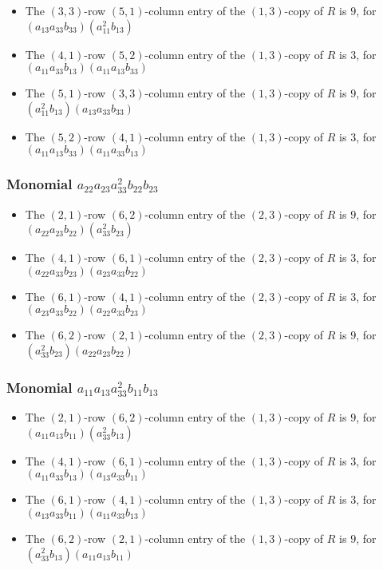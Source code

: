 \documentclass{article}
\begin{document}
\begin{itemize}
\item The $(3, 3)$-row $(5, 1)$-column entry of the $ \left(1, 3\right) $-copy of $R$ is $ 9 $, for $( a_{13} a_{33} b_{33} )( a_{11}^{2} b_{13} )$ 
\item The $(4, 1)$-row $(5, 2)$-column entry of the $ \left(1, 3\right) $-copy of $R$ is $ 3 $, for $( a_{11} a_{33} b_{13} )( a_{11} a_{13} b_{33} )$ 
\item The $(5, 1)$-row $(3, 3)$-column entry of the $ \left(1, 3\right) $-copy of $R$ is $ 9 $, for $( a_{11}^{2} b_{13} )( a_{13} a_{33} b_{33} )$ 
\item The $(5, 2)$-row $(4, 1)$-column entry of the $ \left(1, 3\right) $-copy of $R$ is $ 3 $, for $( a_{11} a_{13} b_{33} )( a_{11} a_{33} b_{13} )$ 
\end{itemize}
\subsubsection{Monomial $ a_{22} a_{23} a_{33}^{2} b_{22} b_{23} $}

\begin{itemize}
\item The $(2, 1)$-row $(6, 2)$-column entry of the $ \left(2, 3\right) $-copy of $R$ is $ 9 $, for $( a_{22} a_{23} b_{22} )( a_{33}^{2} b_{23} )$ 
\item The $(4, 1)$-row $(6, 1)$-column entry of the $ \left(2, 3\right) $-copy of $R$ is $ 3 $, for $( a_{22} a_{33} b_{23} )( a_{23} a_{33} b_{22} )$ 
\item The $(6, 1)$-row $(4, 1)$-column entry of the $ \left(2, 3\right) $-copy of $R$ is $ 3 $, for $( a_{23} a_{33} b_{22} )( a_{22} a_{33} b_{23} )$ 
\item The $(6, 2)$-row $(2, 1)$-column entry of the $ \left(2, 3\right) $-copy of $R$ is $ 9 $, for $( a_{33}^{2} b_{23} )( a_{22} a_{23} b_{22} )$ 
\end{itemize}
\subsubsection{Monomial $ a_{11} a_{13} a_{33}^{2} b_{11} b_{13} $}

\begin{itemize}
\item The $(2, 1)$-row $(6, 2)$-column entry of the $ \left(1, 3\right) $-copy of $R$ is $ 9 $, for $( a_{11} a_{13} b_{11} )( a_{33}^{2} b_{13} )$ 
\item The $(4, 1)$-row $(6, 1)$-column entry of the $ \left(1, 3\right) $-copy of $R$ is $ 3 $, for $( a_{11} a_{33} b_{13} )( a_{13} a_{33} b_{11} )$ 
\item The $(6, 1)$-row $(4, 1)$-column entry of the $ \left(1, 3\right) $-copy of $R$ is $ 3 $, for $( a_{13} a_{33} b_{11} )( a_{11} a_{33} b_{13} )$ 
\item The $(6, 2)$-row $(2, 1)$-column entry of the $ \left(1, 3\right) $-copy of $R$ is $ 9 $, for $( a_{33}^{2} b_{13} )( a_{11} a_{13} b_{11} )$ 
\end{itemize}
\end{document}
